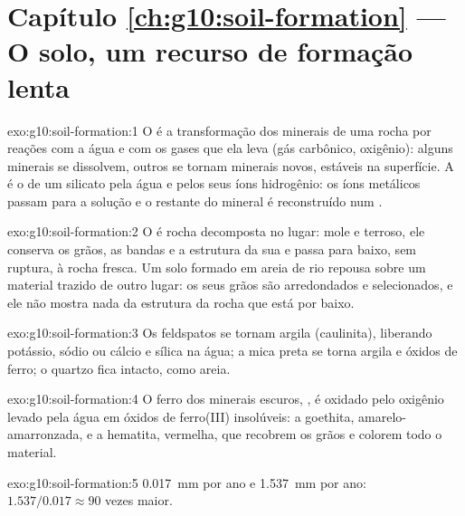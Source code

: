 \section*{Capítulo \ref{ch:g10:soil-formation} --- O solo, um recurso de formação lenta}

\begin{solution}{exo:g10:soil-formation:1}
O  é a transformação dos minerais de uma rocha por
reações com a água e com os gases que ela leva (gás carbônico, oxigênio):
alguns minerais se dissolvem, outros se tornam minerais novos, estáveis na
superfície. A  é o  de um silicato pela água e
pelos seus íons hidrogênio: os íons metálicos passam para a solução e o
restante do mineral é reconstruído num .
\end{solution}

\begin{solution}{exo:g10:soil-formation:2}
O  é rocha decomposta no lugar: mole e terroso, ele conserva os
grãos, as bandas e a estrutura da sua  e passa para baixo, sem
ruptura, à rocha fresca. Um solo formado em areia de rio repousa sobre um
material trazido de outro lugar: os seus grãos são arredondados e
selecionados, e ele não mostra nada da estrutura da rocha que está por
baixo.
\end{solution}

\begin{solution}{exo:g10:soil-formation:3}
Os feldspatos se tornam argila (caulinita), liberando potássio, sódio ou
cálcio e sílica na água; a mica preta se torna argila e óxidos de ferro; o
quartzo fica intacto, como areia.
\end{solution}

\begin{solution}{exo:g10:soil-formation:4}
O ferro dos minerais escuros, , é oxidado pelo oxigênio levado
pela água em óxidos de ferro(III) insolúveis: a goethita, amarelo-amarronzada,
e a hematita, vermelha, que recobrem os grãos e colorem todo o material.
\end{solution}

\begin{solution}{exo:g10:soil-formation:5}
\qty{0.017}{mm} por ano e \qty{1.537}{mm} por ano: $1.537/0.017 \approx 90$
vezes maior.
\end{solution}

